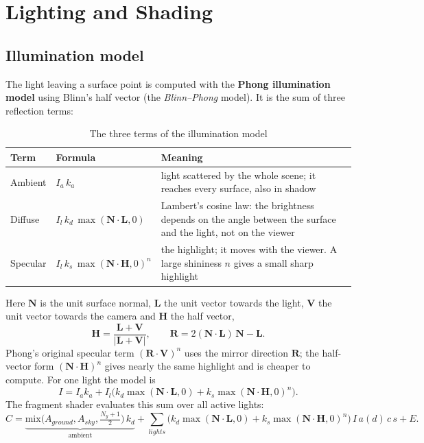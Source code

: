 \section{Lighting and Shading}\label{sec:lighting}
\subsection{Illumination model}
The light leaving a surface point is computed with the \textbf{Phong illumination model} using Blinn's half
vector (the \emph{Blinn--Phong} model). It is the sum of three reflection terms:
\begin{table}[H]
\centering\small
\caption{The three terms of the illumination model}\label{tab:phongterms}
\begin{tabularx}{\linewidth}{@{}P{1.8cm}P{4.6cm}X@{}}
\toprule
Term & Formula & Meaning \\ \midrule
Ambient & $I_a\,k_a$ & light scattered by the whole scene; it reaches every surface, also in shadow \\
Diffuse & $I_l\,k_d\,\max(\mathbf{N}\cdot\mathbf{L},0)$ & Lambert's cosine law: the brightness depends on the angle between the surface and the light, not on the viewer \\
Specular & $I_l\,k_s\,\max(\mathbf{N}\cdot\mathbf{H},0)^{n}$ & the highlight; it moves with the viewer. A large shininess $n$ gives a small sharp highlight \\
\bottomrule
\end{tabularx}
\end{table}
Here $\mathbf{N}$ is the unit surface normal, $\mathbf{L}$ the unit vector towards the light, $\mathbf{V}$ the unit
vector towards the camera and $\mathbf{H}$ the half vector,
\[
\mathbf{H} = \frac{\mathbf{L}+\mathbf{V}}{|\mathbf{L}+\mathbf{V}|},\qquad
\mathbf{R} = 2(\mathbf{N}\cdot\mathbf{L})\,\mathbf{N}-\mathbf{L}.
\]
Phong's original specular term $(\mathbf{R}\cdot\mathbf{V})^n$ uses the mirror direction $\mathbf{R}$; the half-vector
form $(\mathbf{N}\cdot\mathbf{H})^n$ gives nearly the same highlight and is cheaper to compute. For one light the model is
\[
I = I_a k_a + I_l\big(k_d\max(\mathbf{N}\!\cdot\!\mathbf{L},0) + k_s\max(\mathbf{N}\!\cdot\!\mathbf{H},0)^{n}\big).
\]
The fragment shader evaluates this sum over all active lights:
\[
C = \underbrace{\text{mix}\!\big(A_{ground},A_{sky},\tfrac{N_y+1}{2}\big)\,k_d}_{\text{ambient}}
 + \sum_{lights}\Big(k_d\max(\mathbf{N}\!\cdot\!\mathbf{L},0) + k_s\max(\mathbf{N}\!\cdot\!\mathbf{H},0)^{n}\Big)\,I\,a(d)\,c\,s
 + E .
\]

